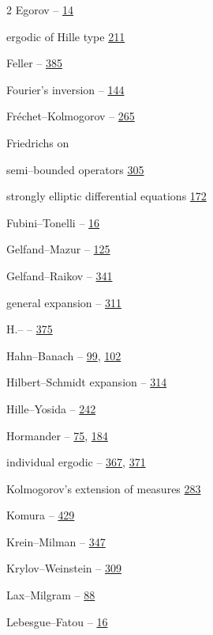 \begin{multicols}{2}
\hspace*{1.1em}Egorov -- \hyperlink{page.14}{14}\par
\hspace*{1.1em}ergodic of Hille type \hyperlink{page.211}{211}\par
\noindent Feller -- \hyperlink{page.385}{385}\par
\noindent Fourier's inversion -- \hyperlink{page.144}{144}\par
\noindent Fréchet--Kolmogorov -- \hyperlink{page.265}{265}\par
\noindent Friedrichs on\par
\hspace*{1.1em}semi--bounded operators \hyperlink{page.305}{305}\par
\hspace*{1.1em}strongly elliptic differential equations \hyperlink{page.172}{172}\par
\noindent Fubini--Tonelli -- \hyperlink{page.16}{16}\par
\noindent Gelfand--Mazur -- \hyperlink{page.125}{125}\par
\noindent Gelfand--Raikov -- \hyperlink{page.341}{341}\par
\noindent general expansion -- \hyperlink{page.311}{311}\par
\noindent H.-- -- \hyperlink{page.375}{375}\par
\noindent Hahn--Banach -- \hyperlink{page.99}{99}, \hyperlink{page.102}{102}\par
\noindent Hilbert--Schmidt expansion -- \hyperlink{page.314}{314}\par
\noindent Hille--Yosida -- \hyperlink{page.242}{242}\par
\noindent Hormander -- \hyperlink{page.75}{75}, \hyperlink{page.184}{184}\par
\noindent individual ergodic -- \hyperlink{page.367}{367}, \hyperlink{page.371}{371}\par
\noindent Kolmogorov's extension of measures \hyperlink{page.283}{283}\par
\noindent Komura -- \hyperlink{page.429}{429}\par
\noindent Krein--Milman -- \hyperlink{page.347}{347}\par
\noindent Krylov--Weinstein -- \hyperlink{page.309}{309}\par
\noindent Lax--Milgram -- \hyperlink{page.88}{88}\par
\noindent Lebesgue--Fatou -- \hyperlink{page.16}{16}\par

\end{multicols}
